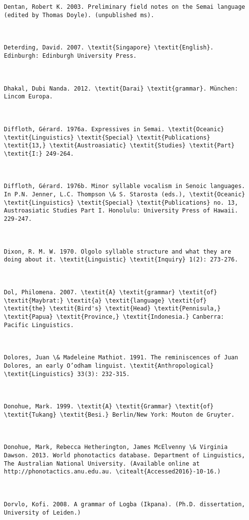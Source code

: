 \begin{verbatim}
Dentan, Robert K. 2003. Preliminary field notes on the Semai language (edited by Thomas Doyle). (unpublished ms).



Deterding, David. 2007. \textit{Singapore} \textit{English}. Edinburgh: Edinburgh University Press.



Dhakal, Dubi Nanda. 2012. \textit{Darai} \textit{grammar}. München: Lincom Europa.



Diffloth, Gérard. 1976a. Expressives in Semai. \textit{Oceanic} \textit{Linguistics} \textit{Special} \textit{Publications} \textit{13,} \textit{Austroasiatic} \textit{Studies} \textit{Part} \textit{I:} 249-264.



Diffloth, Gérard. 1976b. Minor syllable vocalism in Senoic languages. In P.N. Jenner, L.C. Thompson \& S. Starosta (eds.), \textit{Oceanic} \textit{Linguistics} \textit{Special} \textit{Publications} no. 13, Austroasiatic Studies Part I. Honolulu: University Press of Hawaii. 229-247.



Dixon, R. M. W. 1970. Olgolo syllable structure and what they are doing about it. \textit{Linguistic} \textit{Inquiry} 1(2): 273-276.



Dol, Philomena. 2007. \textit{A} \textit{grammar} \textit{of} \textit{Maybrat:} \textit{a} \textit{language} \textit{of} \textit{the} \textit{Bird's} \textit{Head} \textit{Pennisula,} \textit{Papua} \textit{Province,} \textit{Indonesia.} Canberra: Pacific Linguistics.



Dolores, Juan \& Madeleine Mathiot. 1991. The reminiscences of Juan Dolores, an early O’odham linguist. \textit{Anthropological} \textit{Linguistics} 33(3): 232-315.



Donohue, Mark. 1999. \textit{A} \textit{Grammar} \textit{of} \textit{Tukang} \textit{Besi.} Berlin/New York: Mouton de Gruyter.



Donohue, Mark, Rebecca Hetherington, James McElvenny \& Virginia Dawson. 2013. World phonotactics database. Department of Linguistics, The Australian National University. (Available online at http://phonotactics.anu.edu.au. \citealt{Accessed2016}-10-16.)



Dorvlo, Kofi. 2008. A grammar of Logba (Ikpana). (Ph.D. dissertation, University of Leiden.)




\end{verbatim}
